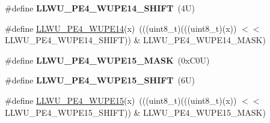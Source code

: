 \begin{DoxyCompactItemize}
\#define {\bfseries L\+L\+W\+U\+\_\+\+P\+E4\+\_\+\+W\+U\+P\+E14\+\_\+\+S\+H\+I\+FT}~(4\+U)
\item 
\#define \mbox{\hyperlink{group___l_l_w_u___register___masks_ga376a97009729f8dde435a783deb148d8}{L\+L\+W\+U\+\_\+\+P\+E4\+\_\+\+W\+U\+P\+E14}}(x)~(((uint8\+\_\+t)(((uint8\+\_\+t)(x)) $<$$<$ L\+L\+W\+U\+\_\+\+P\+E4\+\_\+\+W\+U\+P\+E14\+\_\+\+S\+H\+I\+FT)) \& L\+L\+W\+U\+\_\+\+P\+E4\+\_\+\+W\+U\+P\+E14\+\_\+\+M\+A\+SK)
\item 
\mbox{\label{group___l_l_w_u___register___masks_ga53e48ffd153996ab89adb3c4df7511ee}} 
\#define {\bfseries L\+L\+W\+U\+\_\+\+P\+E4\+\_\+\+W\+U\+P\+E15\+\_\+\+M\+A\+SK}~(0x\+C0\+U)
\item 
\mbox{\label{group___l_l_w_u___register___masks_gaeaf1e05b8de75133c46d6f11b3346732}} 
\#define {\bfseries L\+L\+W\+U\+\_\+\+P\+E4\+\_\+\+W\+U\+P\+E15\+\_\+\+S\+H\+I\+FT}~(6\+U)
\item 
\#define \mbox{\hyperlink{group___l_l_w_u___register___masks_gadd015539f974ee2820707b9abf3787ba}{L\+L\+W\+U\+\_\+\+P\+E4\+\_\+\+W\+U\+P\+E15}}(x)~(((uint8\+\_\+t)(((uint8\+\_\+t)(x)) $<$$<$ L\+L\+W\+U\+\_\+\+P\+E4\+\_\+\+W\+U\+P\+E15\+\_\+\+S\+H\+I\+FT)) \& L\+L\+W\+U\+\_\+\+P\+E4\+\_\+\+W\+U\+P\+E15\+\_\+\+M\+A\+SK)
\end{DoxyCompactItemize}

